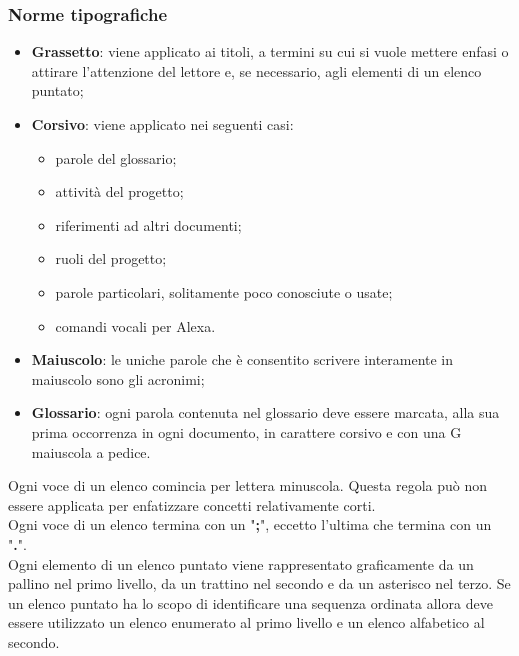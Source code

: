         \subsubsection{Norme tipografiche}
            \begin{itemize}
                    \item\textbf{Grassetto}: viene applicato ai titoli, a termini su cui si vuole mettere enfasi o attirare l'attenzione del lettore e, se necessario, agli elementi di un elenco puntato;
                    \item\textbf{Corsivo}: viene applicato nei seguenti casi:
                            \begin{itemize}
                                \item parole del glossario;
                                \item attività del progetto;
                                \item riferimenti ad altri documenti;
                                \item ruoli del progetto;
                                \item parole particolari, solitamente poco conosciute o usate;
                                \item comandi vocali per Alexa.
                            \end{itemize}
                    \item\textbf{Maiuscolo}: le uniche parole che è consentito scrivere interamente in maiuscolo sono gli acronimi;
                    \item\textbf{Glossario}: ogni parola contenuta nel glossario deve essere marcata, alla sua prima occorrenza in ogni documento, in carattere corsivo e con una G maiuscola a pedice.
                \end{itemize}   
            
            Ogni voce di un elenco comincia per lettera minuscola. Questa regola può non essere applicata per enfatizzare concetti relativamente corti.\\
            Ogni voce di un elenco termina con un "\textbf{;}", eccetto l'ultima che termina con un "\textbf{.}".\\
            Ogni elemento di un elenco puntato viene rappresentato graficamente da un pallino nel primo livello, da un trattino nel secondo e da un asterisco nel terzo. 
            Se un elenco puntato ha lo scopo di identificare una sequenza ordinata allora deve essere utilizzato un elenco enumerato al primo livello e un elenco alfabetico al secondo.
            
